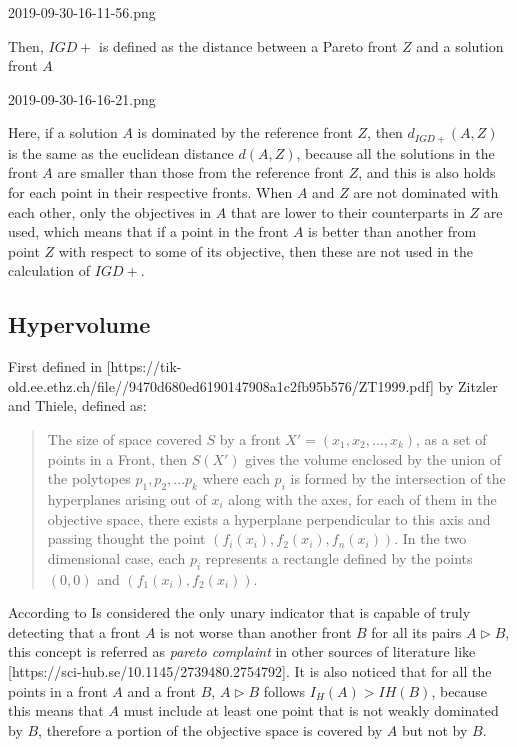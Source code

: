
2019-09-30-16-11-56.png

Then, $IGD+$ is defined as the distance between a Pareto front $Z$ and a solution front $A$  

2019-09-30-16-16-21.png

Here, if a solution $A$ is dominated by the reference front $Z$, then $d_{IGD+}(A,Z)$ is the same as the euclidean distance $d(A,Z)$, because all the solutions in the front $A$ are smaller than those from the reference front $Z$, and this is also holds for each point in their respective fronts. When $A$ and $Z$ are not dominated with each other, only the objectives in $A$ that are lower to their counterparts in $Z$ are used, which means that if a point in the front $A$ is better than another from point $Z$ with respect to some of its objective, then these are not used in the calculation of $IGD+$.

\subsection{Hypervolume}

First defined in [https://tik-old.ee.ethz.ch/file//9470d680ed6190147908a1c2fb95b576/ZT1999.pdf] by Zitzler and Thiele, defined as:

\begin{quote}
The size of space covered $S$ by a front $X' = (x_1, x_2,...,x_k)$, as a set of points in a Front, then $S(X')$ gives the volume enclosed by the union of the polytopes $p_1, p_2,... p_k$ where each $p_i$ is formed by the intersection of the hyperplanes arising out of ${x_i}$ along with the axes, for each of them in the objective space, there exists a hyperplane perpendicular to this axis and passing thought the point $(f_i(x_i), f_2(x_i), f_n(x_i))$. In the two dimensional case, each $p_i$ represents a rectangle defined by the points $(0,0)$ and $(f_1(x_i),f_2(x_i))$.
\end{quote}

According to 
Is considered the only unary indicator that is capable of truly detecting that a front $A$ is not worse than another front $B$ for all its pairs $A\triangleright B $, this concept is referred as \textit{pareto complaint} in other sources of literature like 
[https://sci-hub.se/10.1145/2739480.2754792]. It is also noticed that for all the points in a front $A$ and a front $B$, $A \triangleright B $ follows $I_H(A) > IH(B)$, because this means that $A$ must include at least one point that is not weakly dominated by $B$, therefore a portion of the objective space is covered by $A$ but not by $B$.

